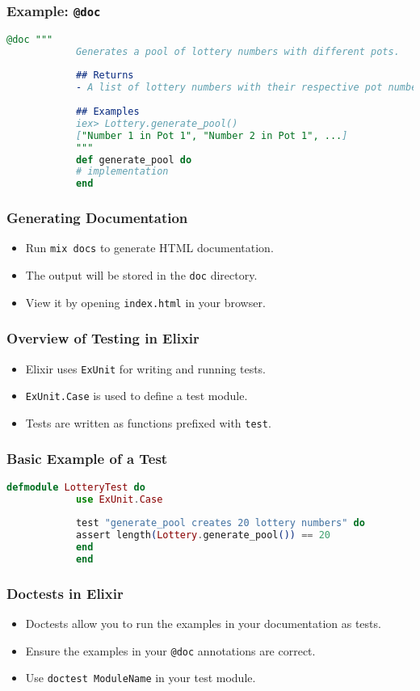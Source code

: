 \documentclass[aspectratio=169, table]{beamer}
\begin{document}
	\begin{frame}[fragile]
		\frametitle{Example: \texttt{@doc}}
		\begin{lstlisting}[language=Elixir]
			@doc """
			Generates a pool of lottery numbers with different pots.
			
			## Returns
			- A list of lottery numbers with their respective pot numbers.
			
			## Examples
			iex> Lottery.generate_pool()
			["Number 1 in Pot 1", "Number 2 in Pot 1", ...]
			"""
			def generate_pool do
			# implementation
			end
		\end{lstlisting}
	\end{frame}
	
	\begin{frame}
		\frametitle{Generating Documentation}
		\begin{itemize}
			\item Run \texttt{mix docs} to generate HTML documentation.
			\item The output will be stored in the \texttt{doc} directory.
			\item View it by opening \texttt{index.html} in your browser.
		\end{itemize}
	\end{frame}
	
	\begin{frame}
		\frametitle{Overview of Testing in Elixir}
		\begin{itemize}
			\item Elixir uses \texttt{ExUnit} for writing and running tests.
			\item \texttt{ExUnit.Case} is used to define a test module.
			\item Tests are written as functions prefixed with \texttt{test}.
		\end{itemize}
	\end{frame}
	
	\begin{frame}[fragile]
		\frametitle{Basic Example of a Test}
		\begin{lstlisting}[language=Elixir]
			defmodule LotteryTest do
			use ExUnit.Case
			
			test "generate_pool creates 20 lottery numbers" do
			assert length(Lottery.generate_pool()) == 20
			end
			end
		\end{lstlisting}
	\end{frame}
	
	\begin{frame}
		\frametitle{Doctests in Elixir}
		\begin{itemize}
			\item Doctests allow you to run the examples in your documentation as tests.
			\item Ensure the examples in your \texttt{@doc} annotations are correct.
			\item Use \texttt{doctest ModuleName} in your test module.
		\end{itemize}
	\end{frame}
	
\end{document}
